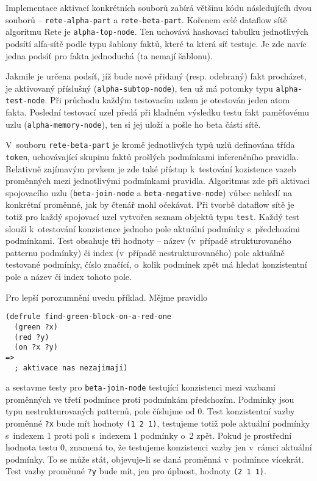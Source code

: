 Implementace aktivací konkrétních souborů zabírá většinu kódu následujícíh dvou
souborů -- \verb|rete-alpha-part| a \verb|rete-beta-part|. Kořenem celé dataflow
sítě algoritmu Rete je \verb|alpha-top-node|. Ten uchovává hashovací tabulku
jednotlivých podsítí alfa-sítě podle typu šablony faktů, které ta která síť
testuje. Je zde navíc jedna podsíť pro fakta jednoduchá (ta nemají šablonu).

Jakmile je určena podsíť, jíž bude nově přidaný (resp. odebraný) fakt procházet,
je aktivovaný příslušný  (\verb|alpha-subtop-node|), ten už má
potomky typu \verb|alpha-test-node|. Při průchodu každým testovacím uzlem je
otestován jeden atom fakta. Poslední testovací uzel předá při kladném výsledku
testu fakt paměťovému uzlu (\verb|alpha-memory-node|), ten si jej uloží
a pošle ho beta části sítě.

V~souboru \verb|rete-beta-part| je kromě jednotlivých typů uzlů definována třída
\verb|token|, uchovávající skupinu faktů prošlých podmínkami inferenčního 
pravidla. Relativně zajímavým prvkem je zde také přístup k~testování  kozistence
vazeb proměnných mezi jednotlivými podmínkami pravidla. Algoritmus zde při
aktivaci spojovacího uzlu (\verb|beta-join-node| a \verb|beta-negative-node|)
vůbec nehledí na konkrétní proměnné, jak by čtenář mohl očekávat. Při tvorbě
dataflow sítě je totiž pro každý spojovací uzel vytvořen seznam objektů typu
\verb|test|. Každý test slouží k~otestování konzistence jednoho pole aktuální
podmínky s~předchozími podmínkami. Test obsahuje tři hodnoty -- název (v~případě
strukturovaného patternu podmínky) či index (v~případě nestrukturovaného)
pole aktuálně testované podmínky, číslo značící, o~kolik podmínek zpět má hledat
konzistentní pole a název či index tohoto pole.

Pro lepší porozumnění uvedu příklad. Mějme pravidlo
\begin{verbatim}
(defrule find-green-block-on-a-red-one
  (green ?x)
  (red ?y)
  (on ?x ?y)
=>
  ; aktivace nas nezajimaji)
\end{verbatim}
a sestavme testy pro \verb|beta-join-node| testující konzistenci mezi vazbami
proměnných ve třetí podmínce proti podmínkám předchozím. Podmínky jsou typu
nestrukturovaných patternů, pole číslujme od 0. Test konzistentní vazby
proměnné \verb|?x| bude mít hodnoty \verb|(1 2 1)|, testujeme totiž pole
aktuální podmínky s~indexem 1 proti poli s~indexem 1 podmínky o~2 zpět.
Pokud je prostřední hodnota testu 0, znamená to, že testujeme konzistenci vazby
jen v~rámci aktuální podmínky. To se může stát, objevuje-li se daná proměnná
v~podmínce vícekrát. Test vazby proměnné \verb|?y| bude mít, jen pro úplnost,
hodnoty \verb|(2 1 1)|.

